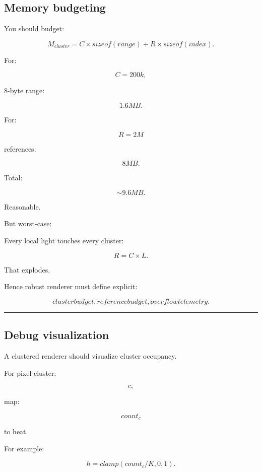 \subsection{Memory budgeting}\label{04-visual-computing-ii-ch040-memory-budgeting}

\hypertarget{04-visual-computing-ii-ch040-memory-budgeting}{}

You should budget:

\[
M_{cluster}
=
C\times sizeof(range)
+
R\times sizeof(index).
\]

For:

\[
C=200k,
\]

8-byte range:

\[
1.6MB.
\]

For:

\[
R=2M
\]

references:

\[
8MB.
\]

Total:

\[
\sim9.6MB.
\]

Reasonable.

But worst-case:

Every local light touches every cluster:

\[
R=C\times L.
\]

That explodes.

Hence robust renderer must define explicit:

\[
\boxed{
cluster budget,
reference budget,
overflow telemetry.
}
\]

\begin{center}\rule{0.5\linewidth}{0.5pt}\end{center}

\subsection{Debug visualization}\label{04-visual-computing-ii-ch040-debug-visualization}

\hypertarget{04-visual-computing-ii-ch040-debug-visualization}{}

A clustered renderer should visualize cluster occupancy.

For pixel cluster:

\[
c,
\]

map:

\[
count_c
\]

to heat.

For example:

\[
h=
clamp(
count_c/K,
0,1
).
\]

